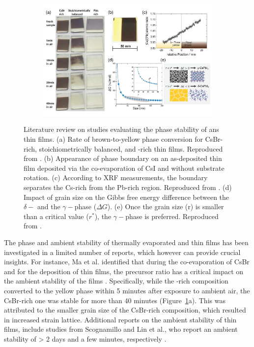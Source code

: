 \begin{figure}[htbp]
    \centering
    \begin{subfigure}[t]{0.99\textwidth}
        \centering
        \includegraphics[width=\textwidth]{chapters/stability/imeges/Stability_Lierature.pdf} %
    \end{subfigure}

    \caption{Literature review on studies evaluating the phase stability of  ans  thin films. (a) Rate of brown-to-yellow phase conversion for CsBr-rich, stoichiometrically balanced, and -rich  thin films. Reproduced from \cite{Ma2017TheCells}. (b) Appearance of phase boundary on an as-deposited  thin film deposited via the co-evaporation of CsI and  without substrate rotation. (c) According to XRF measurements, the boundary separates the Cs-rich from the Pb-rich region. Reproduced from \cite{Becker2019LowExperimentation}. (d) Impact of grain size on the Gibbs free energy difference between the $\delta-$ and the $\gamma-$phase ($\Delta G$).  (e) Once the grain size (r) is smaller than a critical value ($r^*$), the $\gamma-$phase is preferred. Reproduced from \cite{Dong2023GrowthFilm}. }
    \label{fig:stability:literature_review}
\end{figure}


The phase and ambient stability of thermally evaporated  and  thin films has been investigated in a limited number of reports, which however can provide crucial insights. For instance, Ma et al. identified that during the co-evaporation of CsBr and  for the deposition of  thin films, the precursor ratio has a critical impact on the ambient stability of the films \cite{Ma2017TheCells}. Specifically, while the -rich composition converted to the yellow phase within 5 minutes after exposure to ambient air, the CsBr-rich one was stable for more than 40 minutes (Figure~\ref{fig:stability:literature_review}a). This was attributed to the smaller grain size of the CsBr-rich composition, which resulted in increased strain lattice. Additional reports on the ambient stability of  thin films, include studies from Scognamillo and Lin et al., who report an ambient stability of > 2 days and a few minutes, respectively \cite{Scognamillo2019FullyCsPbI2Br, Lin2019EfficientDeposition}.

